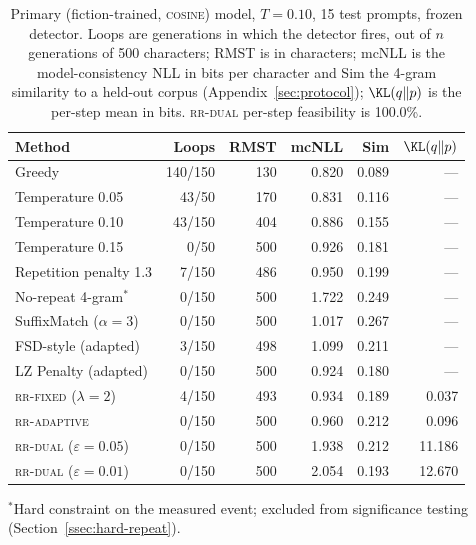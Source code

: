 \begin{table}[ht]
\centering
\caption{Primary (fiction-trained, \textsc{cosine}) model, $T{=}0.10$, 15 test prompts, frozen detector. Loops are generations in which the detector fires, out of $n$ generations of 500 characters; RMST is in characters; mcNLL is the model-consistency NLL in bits per character and Sim the 4-gram similarity to a held-out corpus (Appendix~\ref{sec:protocol}); $\KL(q\Vert p)$ is the per-step mean in bits. \textsc{rr-dual} per-step feasibility is 100.0\%.}
\label{tab:main}
\begin{tabular}{@{}lrrrrr@{}}
\toprule
Method & Loops & RMST & mcNLL & Sim & $\KL(q\Vert p)$ \\
\midrule
Greedy & 140/150 & 130   & 0.820 & 0.089 & --- \\
Temperature 0.05 & 43/50 & 170   & 0.831 & 0.116 & --- \\
Temperature 0.10 & 43/150 & 404   & 0.886 & 0.155 & --- \\
Temperature 0.15 & 0/50 & 500   & 0.926 & 0.181 & --- \\
Repetition penalty 1.3 & 7/150 & 486   & 0.950 & 0.199 & --- \\
No-repeat 4-gram$^{*}$ & 0/150 & 500   & 1.722 & 0.249 & --- \\
SuffixMatch ($\alpha{=}3$) & 0/150 & 500   & 1.017 & 0.267 & --- \\
FSD-style (adapted) & 3/150 & 498   & 1.099 & 0.211 & --- \\
LZ Penalty (adapted) & 0/150 & 500   & 0.924 & 0.180 & --- \\
\textsc{rr-fixed} ($\lambda{=}2$) & 4/150 & 493   & 0.934 & 0.189 & 0.037 \\
\textsc{rr-adaptive} & 0/150 & 500   & 0.960 & 0.212 & 0.096 \\
\textsc{rr-dual} ($\varepsilon{=}0.05$) & 0/150 & 500 & 1.938 & 0.212 & 11.186 \\
\textsc{rr-dual} ($\varepsilon{=}0.01$) & 0/150 & 500 & 2.054 & 0.193 & 12.670 \\
\bottomrule
\end{tabular}

\vspace{4pt}
{\footnotesize $^{*}$Hard constraint on the measured event; excluded from significance testing (Section~\ref{ssec:hard-repeat}).}
\end{table}